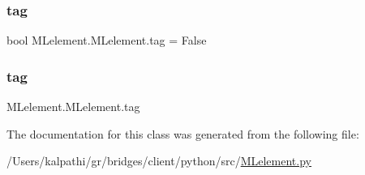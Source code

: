 \hypertarget{class_m_lelement_1_1_m_lelement_a73d6150c8466884ef6a5be9995494ad0}{}\label{class_m_lelement_1_1_m_lelement_a73d6150c8466884ef6a5be9995494ad0} 
\subsubsection{\texorpdfstring{tag}{tag}\hspace{0.1cm}{\footnotesize\ttfamily [1/2]}}
{\footnotesize\ttfamily bool M\+Lelement.\+M\+Lelement.\+tag = False\hspace{0.3cm}{\ttfamily [static]}}

\hypertarget{class_m_lelement_1_1_m_lelement_ae7e3455395f34a27e1a7e8fa26adce50}{}\label{class_m_lelement_1_1_m_lelement_ae7e3455395f34a27e1a7e8fa26adce50} 
\subsubsection{\texorpdfstring{tag}{tag}\hspace{0.1cm}{\footnotesize\ttfamily [2/2]}}
{\footnotesize\ttfamily M\+Lelement.\+M\+Lelement.\+tag}



The documentation for this class was generated from the following file\+:\begin{DoxyCompactItemize}
\item 
/\+Users/kalpathi/gr/bridges/client/python/src/\hyperlink{_m_lelement_8py}{M\+Lelement.\+py}\end{DoxyCompactItemize}
